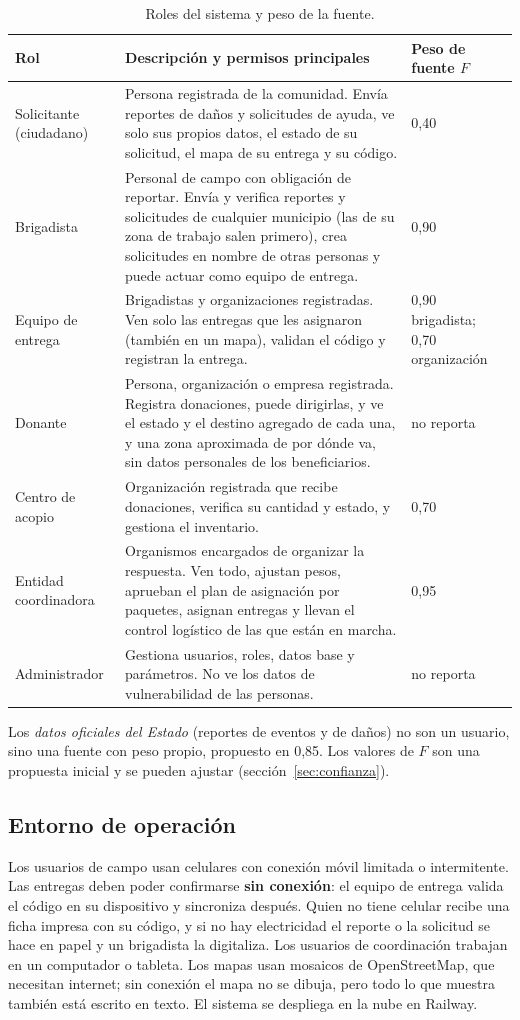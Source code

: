 \begin{table}[H]
\centering
\caption{Roles del sistema y peso de la fuente.}
\begin{tabularx}{\textwidth}{@{}p{2.8cm}Xl@{}}
\toprule
\textbf{Rol} & \textbf{Descripción y permisos principales} & \textbf{Peso de fuente $F$} \\
\midrule
Solicitante (ciudadano) & Persona registrada de la comunidad. Envía reportes de daños y solicitudes de ayuda, ve solo sus propios datos, el estado de su solicitud, el mapa de su entrega y su código. & 0,40 \\
Brigadista & Personal de campo con obligación de reportar. Envía y verifica reportes y solicitudes de cualquier municipio (las de su zona de trabajo salen primero), crea solicitudes en nombre de otras personas y puede actuar como equipo de entrega. & 0,90 \\
Equipo de entrega & Brigadistas y organizaciones registradas. Ven solo las entregas que les asignaron (también en un mapa), validan el código y registran la entrega. & 0,90 brigadista; 0,70 organización \\
Donante & Persona, organización o empresa registrada. Registra donaciones, puede dirigirlas, y ve el estado y el destino agregado de cada una, y una zona aproximada de por dónde va, sin datos personales de los beneficiarios. & no reporta \\
Centro de acopio & Organización registrada que recibe donaciones, verifica su cantidad y estado, y gestiona el inventario. & 0,70 \\
Entidad coordinadora &Organismos encargados de organizar la respuesta. Ven todo, ajustan pesos, aprueban el plan de asignación por paquetes, asignan entregas y llevan el control logístico de las que están en marcha. & 0,95 \\
Administrador & Gestiona usuarios, roles, datos base y parámetros. No ve los datos de vulnerabilidad de las personas. & no reporta \\
\bottomrule
\end{tabularx}
\end{table}

Los \emph{datos oficiales del Estado} (reportes de eventos y de daños) no son un usuario, sino una fuente con peso propio, propuesto en 0,85. Los valores de $F$ son una propuesta inicial y se pueden ajustar (sección~\ref{sec:confianza}).

\subsection{Entorno de operación}
Los usuarios de campo usan celulares con conexión móvil limitada o intermitente. Las entregas deben poder confirmarse \textbf{sin conexión}: el equipo de entrega valida el código en su dispositivo y sincroniza después. Quien no tiene celular recibe una ficha impresa con su código, y si no hay electricidad el reporte o la solicitud se hace en papel y un brigadista la digitaliza. Los usuarios de coordinación trabajan en un computador o tableta. Los mapas usan mosaicos de OpenStreetMap, que necesitan internet; sin conexión el mapa no se dibuja, pero todo lo que muestra también está escrito en texto. El sistema se despliega en la nube en Railway.

